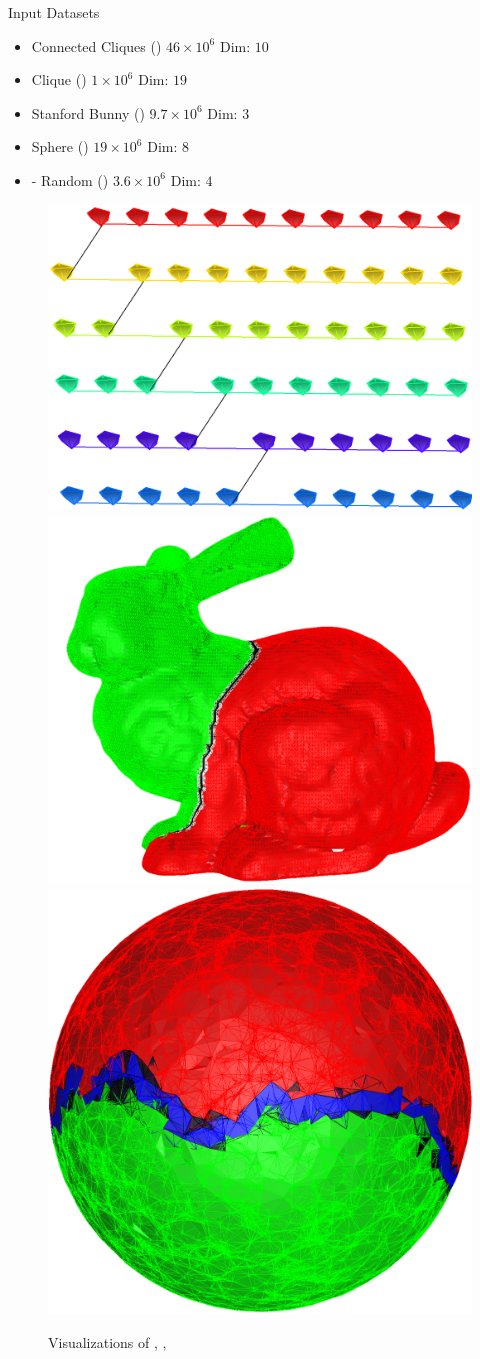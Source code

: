 \begin{frame}{Input Datasets}
\begin{itemize}
	\item Connected Cliques ({\multiblob}) $46 \times 10^6$ Dim: $10$
	\item Clique ({\clique}) $1 \times 10^6$ Dim: $19$
	\item Stanford Bunny ({\bunny}) $9.7 \times 10^6$ Dim: $3$
	\item Sphere ({\sphere}) $19 \times 10^6$ Dim: $8$
	\item {\Erdos}-{\Renyi} Random ({\gnp}) $3.6 \times 10^6$ Dim: $4$
\end{itemize}
\begin{figure}
	\includegraphics[width=.25\textwidth]{embedding.png}
	\hfill
	\includegraphics[width=.25\textwidth]{bunny-2.pdf}
	\hfill
	\includegraphics[width=.25\textwidth]{sphere-2.pdf}
\caption{Visualizations of {\multiblob}, {\bunny}, {\sphere}}
\end{figure}
\end{frame}

\begin{frame}

\end{frame}

\begin{frame}

\end{frame}